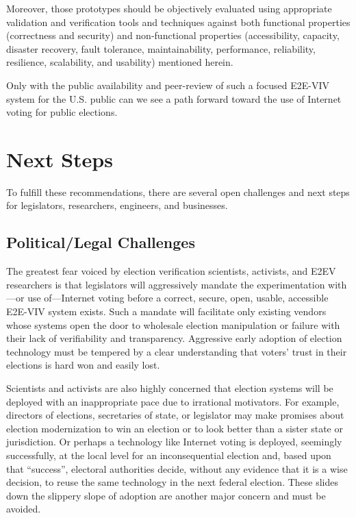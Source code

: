 Moreover, those prototypes should be objectively evaluated using
appropriate validation and verification tools and techniques against
both functional properties (correctness and security) and
non-functional properties (accessibility, capacity, disaster recovery,
fault tolerance, maintainability, performance, reliability,
resilience, scalability, and usability) mentioned herein.

Only with the public availability and peer-review of such a focused
E2E-VIV system for the U.S. public can we see a path forward
toward the use of Internet voting for public elections.

\section{Next Steps}
\label{sec:next-steps}

To fulfill these recommendations, there are several open challenges
and next steps for legislators, researchers, engineers, and
businesses.

\subsection{Political/Legal Challenges}

The greatest fear voiced by election verification scientists,
activists, and E2EV researchers is that legislators will aggressively
mandate the experimentation with---or use of---Internet voting before
a correct, secure, open, usable, accessible E2E-VIV system
exists. Such a mandate will facilitate only existing vendors whose
systems open the door to wholesale election manipulation or failure
with their lack of verifiability and transparency. Aggressive early
adoption of election technology must be tempered by a clear
understanding that voters' trust in their elections is hard won and
easily lost.

Scientists and activists are also highly concerned that election
systems will be deployed with an inappropriate pace due to irrational
motivators. For example, directors of elections, secretaries of state,
or legislator may make promises about election modernization to win an
election or to look better than a sister state or jurisdiction. Or
perhaps a technology like Internet voting is deployed, seemingly
successfully, at the local level for an inconsequential election and,
based upon that ``success'', electoral authorities decide, without any
evidence that it is a wise decision, to reuse the same technology in
the next federal election. These slides down the slippery slope of
adoption are another major concern and must be avoided.

